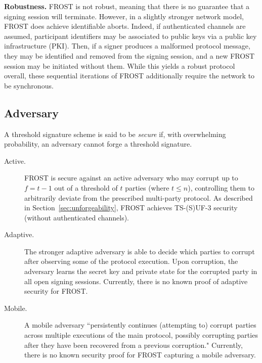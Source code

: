 \noindent \textbf{Robustness.} FROST is not robust, meaning that there is no guarantee that a signing session will terminate.
However, in a slightly stronger network model, FROST does achieve identifiable aborts.
Indeed, if authenticated channels are assumed, participant identifiers may be associated to public keys via a public key infrastructure (PKI).
Then, if a signer produces a malformed protocol message, they may be identified and removed from the signing session, and a new FROST session may be initiated without them.
While this yields a robust protocol overall, these sequential iterations of FROST additionally require the network to be synchronous.

\subsection{Adversary}

A threshold signature scheme is said to be \emph{secure} if, with overwhelming probability, an adversary cannot forge a threshold signature.

\begin{description}

\item[Active.] FROST is secure against an active adversary who may corrupt up to $f = t-1$ out of a threshold of $t$ parties (where $t \leq n$), controlling them to arbitrarily deviate from the prescribed multi-party protocol.   As described in Section~\ref{sec:unforgeability}, FROST achieves TS-(S)UF-3 security~\cite{BellareCKMTZ22} (without authenticated channels).

\item[Adaptive.] The stronger adaptive adversary is able to decide which parties to corrupt after observing some of the protocol execution.
Upon corruption, the adversary learns the secret key and private state for the corrupted party in all open signing sessions.
Currently, there is no known proof of adaptive security for FROST.

\item[Mobile.] A mobile adversary ``persistently continues (attempting to) corrupt parties across multiple executions of the main protocol, possibly corrupting parties after they have been recovered from a previous corruption."
Currently, there is no known security proof for FROST capturing a mobile adversary.

\end{description}

